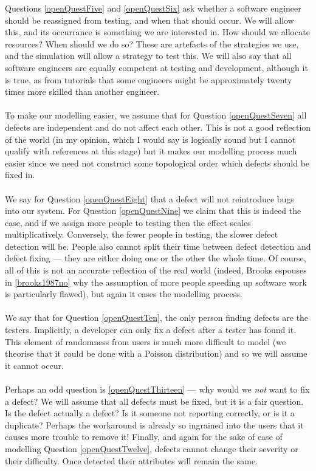 Questions \ref{openQuestFive} and \ref{openQuestSix} ask whether a software engineer should be reassigned from testing, and
when that should occur.
We will allow this, and its occurrance is something we are interested in.
How should we allocate resources?
When should we do so?
These are artefacts of the strategies we use, and the simulation will allow a strategy to test
this.
We will also say that all software engineers are equally competent at testing and development,
although it is true, as from tutorials that some engineers might be approximately twenty times
more skilled than another engineer.\\
\\
To make our modelling easier, we assume that for Question \ref{openQuestSeven} all defects are
independent and do not affect each other.
This is not a good reflection of the world (in my opinion, which I would say is
    logically sound but I cannot qualify with references at this stage) but it makes our modelling process much
easier since we need not construct some topological order which defects should be fixed in.\\
\\
We say for Question \ref{openQuestEight} that a defect will not reintroduce bugs into our system.
For Question \ref{openQuestNine} we claim that this is indeed the case, and if we assign more people
to testing then the effect scales multiplicatively.
Conversely, the fewer people in testing, the slower defect detection will be.
People also cannot split their time between defect detection and defect fixing --- they are either
doing one or the other the whole time.
Of course, all of this is not an accurate reflection of the real world (indeed, Brooks espouses in
\ref{brooks1987no} why the assumption of more people speeding up software work is particularly flawed), but again
it eases the modelling process.\\
\\
We say that for Question \ref{openQuestTen}, the only person finding defects are the
testers.
Implicitly, a developer can only fix a defect after a tester has found it.
This element of randomness from users is much more difficult to model (we theorise that it could be
done with a Poisson distribution) and so we will assume it cannot occur.\\
\\
Perhaps an odd question is \ref{openQuestThirteen} --- why would we {\em not}
want to fix a defect?
We will assume that all defects must be fixed, but it is a fair question.
Is the defect actually a defect?
Is it someone not reporting correctly, or is it a duplicate?
Perhaps the workaround is already so ingrained into the users that it causes
more trouble to remove it!
Finally, and again for the sake of ease of modelling Question \ref{openQuestTwelve}, defects cannot
change their severity or their difficulty.
Once detected their attributes will remain the same.

